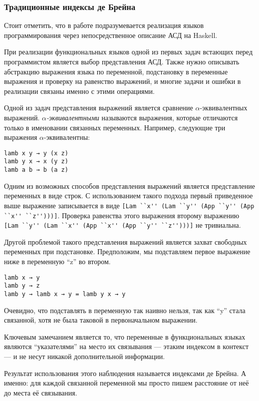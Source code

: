 \subsubsection{Традиционные индексы де Брейна}\label{de_brujin}
Стоит отметить, что в работе подразумевается реализация языков программирования через непосредственное описание АСД на Haskell.

При реализации функциональных языков одной из первых задач встающих перед программистом является выбор представления АСД. Также нужно описывать абстракцию выражения языка по переменной, подстановку в переменные выражения и проверку на равенство выражений, и многие задачи и ошибки в реализации связаны именно с этими операциями.

Одной из задач представления выражений является сравнение $\alpha$-эквивалентных выражений. \textit{$\alpha$-эквивалентными} называются выражения, которые отличаются только в именовании связанных переменных. Например, следующие три выражения $\alpha$-эквивалентны:

\begin{lstlisting}
lamb x y → y (x z)
lamb y x → x (y z)
lamb a b → b (a z)
\end{lstlisting}

Одним из возможных способов представления выражений является представление переменных в виде строк. С использованием такого подхода первый приведенное выше выражение записывается в виде \lstinline{[Lam ``x'' (Lam ``y'' (App ``y'' (App ``x'' ``z'')))]}. Проверка равенства этого выражения второму выражению \lstinline{[Lam ``y'' (Lam ``x'' (App ``x'' (App ``y'' ``z'')))]} не тривиальна.

Другой проблемой такого представления выражений является захват свободных переменных при подстановке. Предположим, мы подставляем первое выражение ниже в переменную ``z'' во втором.
\begin{lstlisting}
lamb x → y
lamb y → z
lamb y → lamb x → y = lamb y x → y
\end{lstlisting}

Очевидно, что подставлять в переменную так наивно нельзя, так как ``y'' стала связанной, хотя не была таковой в первоначальном выражении.

Ключевым замечанием является то, что переменные в функциональных языках являются ``указателями'' на место их связывания --- этаким индексом в контекст --- и не несут никакой дополнительной информации.

Результат использования этого наблюдения называется индексами де Брейна. А именно: для каждой связанной переменной мы просто пишем расстояние от неё до места её связывания.

